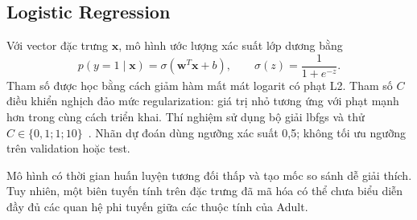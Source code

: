 \subsection{Logistic Regression}
\label{subsec:2_4_1}
Với vector đặc trưng $\mathbf{x}$, mô hình ước lượng xác suất lớp dương bằng
\[
p(y=1\mid\mathbf{x})=\sigma(\mathbf{w}^{T}\mathbf{x}+b),\qquad
\sigma(z)=\frac{1}{1+e^{-z}}.
\]
Tham số được học bằng cách giảm hàm mất mát logarit có phạt L2. Tham số $C$ điều khiển nghịch đảo mức regularization: giá trị nhỏ tương ứng với phạt mạnh hơn trong cùng cách triển khai. Thí nghiệm sử dụng bộ giải lbfgs và thử $C\in\{0{,}1;1;10\}$~\cite{sklearn-logistic}. Nhãn dự đoán dùng ngưỡng xác suất 0,5; không tối ưu ngưỡng trên validation hoặc test.

Mô hình có thời gian huấn luyện tương đối thấp và tạo mốc so sánh dễ giải thích. Tuy nhiên, một biên tuyến tính trên đặc trưng đã mã hóa có thể chưa biểu diễn đầy đủ các quan hệ phi tuyến giữa các thuộc tính của Adult.
